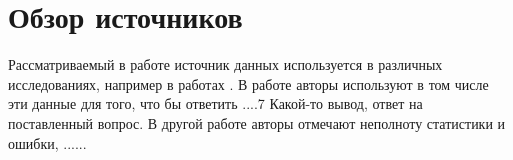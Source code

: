 \section{Обзор источников}

Рассматриваемый в работе источник данных используется в различных исследованиях, например в работах \cite{wiki_1,wiki_2}. В работе \cite{wiki_3} авторы используют в том числе эти данные для того, что бы ответить ....7 Какой-то вывод, ответ на поставленный вопрос. В другой работе \cite{wiki_5} авторы отмечают неполноту статистики и ошибки, ...... 